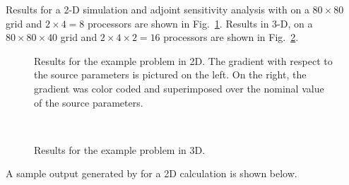 Results for a 2-D simulation and adjoint sensitivity analysis with 
on a $80 \times 80$ grid and $2 \times 4 = 8$ processors are shown in Fig.~\ref{f:pvakx2D}.
Results in 3-D, on a $80 \times 80 \times 40$ grid and $2 \times 4 \times 2= 16$ processors
are shown in Fig.~\ref{f:pvakx3D}.
\begin{figure}
  {\centerline{}}
  \caption[Results for the  example problem in 2D.]
  {Results for the  example problem in 2D. 
    The gradient with respect to the source parameters is pictured on the left. 
    On the right, the gradient was color coded and superimposed over the nominal value 
    of the source parameters.}
  \label{f:pvakx2D}
\end{figure}
\begin{figure}
  \begin{center}
    \mbox{
    }
    \mbox{
    }
  \end{center}
  \caption{Results for the  example problem in 3D.}
  \label{f:pvakx3D}
\end{figure}
A sample output generated by  for a 2D calculation is shown below.

\vspace{0.1in}

